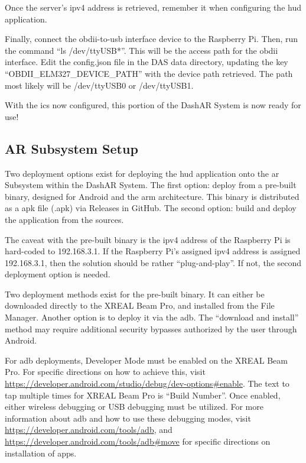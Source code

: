             \par Once the server's \gls{ipv4} address is retrieved, remember it when configuring the \gls{hud} application.

            \par Finally, connect the \gls{obdii}-to-\gls{usb} interface device to the Raspberry Pi. Then, run the command ``ls /dev/ttyUSB*''. This will be the access path for the \gls{obdii} interface. Edit the config.json file in the DAS data directory, updating the key ``OBDII\_ELM327\_DEVICE\_PATH'' with the device path retrieved. The path most likely will be /dev/ttyUSB0 or /dev/ttyUSB1.

            \par With the \gls{ics} now configured, this portion of the DashAR System is now ready for use!

        \subsection{AR Subsystem Setup}
            \par Two deployment options exist for deploying the \gls{hud} application onto the \gls{ar} Subsystem within the DashAR System. The first option: deploy from a pre-built binary, designed for Android and the \gls{arm} architecture. This binary is distributed as a \gls{apk} file (.apk) via Releases in GitHub. The second option: build and deploy the application from the sources.

            \par The caveat with the pre-built binary is the \gls{ipv4} address of the Raspberry Pi is hard-coded to 192.168.3.1. If the Raspberry Pi's assigned \gls{ipv4} address is assigned 192.168.3.1, then the solution should be rather ``plug-and-play''. If not, the second deployment option is needed.

            \par Two deployment methods exist for the pre-built binary. It can either be downloaded directly to the XREAL Beam Pro, and installed from the File Manager. Another option is to deploy it via the \gls{adb}. The ``download and install'' method may require additional security bypasses authorized by the user through Android.

            \par For \gls{adb} deployments, Developer Mode must be enabled on the XREAL Beam Pro. For specific directions on how to achieve this, visit \url{https://developer.android.com/studio/debug/dev-options#enable}. The text to tap multiple times for XREAL Beam Pro is ``Build Number''. Once enabled, either wireless debugging or USB debugging must be utilized. For more information about \gls{adb} and how to use these debugging modes, visit \url{https://developer.android.com/tools/adb}, and \url{https://developer.android.com/tools/adb#move} for specific directions on installation of apps.

